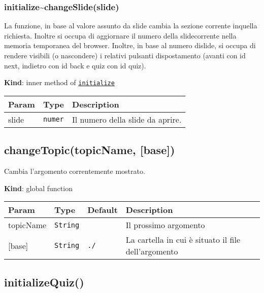 \protect\hypertarget{initialize..changeSlide}{}{}

\hypertarget{initializechangeslideslide}{%
\subsubsection{initialize\textasciitilde{}changeSlide(slide)}\label{initializechangeslideslide}}

La funzione, in base al valore assunto da slide cambia la sezione
corrente inquella richiesta. Inoltre si occupa di aggiornare il numero
della slidecorrente nella memoria temporanea del browser. Inoltre, in
base al numero dislide, si occupa di rendere visibili (o nascondere) i
relativi pulsanti dispostamento (avanti con id next, indietro con id
back e quiz con id quiz).

\textbf{Kind}: inner method of
\protect\hyperlink{initialize}{\texttt{initialize}}

\begin{tabularx}{\textwidth}{XXX}
\toprule
Param & Type & Description\tabularnewline
\midrule
\endhead
slide & \texttt{numer} & Il numero della slide da aprire.\tabularnewline
\bottomrule
\end{tabularx}

\protect\hypertarget{changeTopic}{}{}

\hypertarget{changetopictopicname-base}{%
\subsection{changeTopic(topicName,
{[}base{]})}\label{changetopictopicname-base}}

Cambia l'argomento correntemente mostrato.

\textbf{Kind}: global function

\begin{tabularx}{\textwidth}{XXXX}
\toprule
Param & Type & Default & Description\tabularnewline
\midrule
\endhead
topicName & \texttt{String} & & Il prossimo argomento\tabularnewline
{[}base{]} & \texttt{String} & \texttt{./} & La cartella in cui è
situato il file dell'argomento\tabularnewline
\bottomrule
\end{tabularx}

\protect\hypertarget{initializeQuiz}{}{}

\hypertarget{initializequiz}{%
\subsection{initializeQuiz()}\label{initializequiz}}

